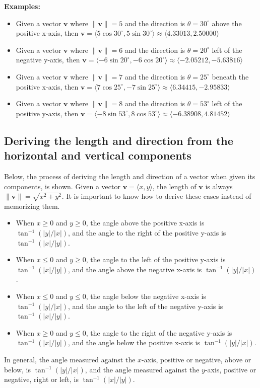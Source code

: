 \documentclass{article}
\begin{document}
\textbf{Examples:}
\begin{itemize}
\item Given a vector \(\mathbf{v}\) where \(\|\mathbf{v}\| = 5\) and the direction is \(\theta = 30^\circ\) above the positive x-axis, then \(\mathbf{v} = \langle 5\cos 30^\circ, 5\sin 30^\circ \rangle \approx \langle 4.33013, 2.50000 \rangle\)
\item Given a vector \(\mathbf{v}\) where \(\|\mathbf{v}\| = 6\) and the direction is \(\theta = 20^\circ\) left of the negative y-axis, then \(\mathbf{v} = \langle -6\sin 20^\circ, -6\cos 20^\circ \rangle \approx \langle -2.05212, -5.63816 \rangle\)
\item Given a vector \(\mathbf{v}\) where \(\|\mathbf{v}\| = 7\) and the direction is \(\theta = 25^\circ\) beneath the positive x-axis, then \(\mathbf{v} = \langle 7\cos 25^\circ, -7\sin 25^\circ \rangle \approx \langle 6.34415, -2.95833 \rangle\)
\item Given a vector \(\mathbf{v}\) where \(\|\mathbf{v}\| = 8\) and the direction is \(\theta = 53^\circ\) left of the positive y-axis, then \(\mathbf{v} = \langle -8\sin 53^\circ, 8\cos 53^\circ \rangle \approx \langle -6.38908, 4.81452 \rangle\)
\end{itemize}



\subsection*{Deriving the length and direction from the horizontal and vertical components}

Below, the process of deriving the length and direction of a vector when given its components, is shown. Given a vector \(\mathbf{v} = \langle x, y \rangle\), the length of \(\mathbf{v}\) is always \(\|\mathbf{v}\| = \sqrt{x^2 + y^2}\). It is important to know how to derive these cases instead of memorizing them.
\begin{itemize}
\item When \(x \geq 0\) and \(y \geq 0\), the angle above the positive x-axis is \(\tan^{-1}(|y|/|x|)\), and the angle to the right of the positive y-axis is \(\tan^{-1}(|x|/|y|)\).
\item When \(x \leq 0\) and \(y \geq 0\), the angle to the left of the positive y-axis is \(\tan^{-1}(|x|/|y|)\), and the angle above the negative x-axis is \(\tan^{-1}(|y|/|x|)\).
\item When \(x \leq 0\) and \(y \leq 0\), the angle below the negative x-axis is \(\tan^{-1}(|y|/|x|)\), and the angle to the left of the negative y-axis is \(\tan^{-1}(|x|/|y|)\).
\item When \(x \geq 0\) and \(y \leq 0\), the angle to the right of the negative y-axis is \(\tan^{-1}(|x|/|y|)\), and the angle below the positive x-axis is \(\tan^{-1}(|y|/|x|)\).
\end{itemize}
In general, the angle measured against the \(x\)-axis, positive or negative, above or below, is \(\tan^{-1}(|y|/|x|)\), and the angle measured against the \(y\)-axis, positive or negative, right or left, is \(\tan^{-1}(|x|/|y|)\).
\end{document}
